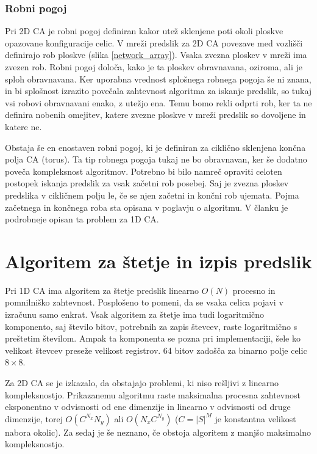 \documentclass[12pt,a4paper,openany,twoside]{book}
\begin{document}
\subsection{Robni pogoj}

Pri 2D CA je robni pogoj definiran kakor utež sklenjene poti okoli ploskve opazovane konfiguracije celic.
V mreži predslik za 2D CA povezave med vozlišči definirajo rob ploskve (slika \ref{network_array}).
Vsaka zvezna ploskev v mreži ima zvezen rob. Robni pogoj določa, kako je ta ploskev obravnavana,
oziroma, ali je sploh obravnavana.
Ker uporabna vrednost splošnega robnega pogoja še ni znana,
in bi splošnost izrazito povečala zahtevnost algoritma za iskanje predslik,
so tukaj vsi robovi obravnavani enako, z utežjo ena. Temu bomo rekli odprti rob,
ker ta ne definira nobenih omejitev, katere zvezne ploskve v mreži predslik
so dovoljene in katere ne.

Obstaja še en enostaven robni pogoj, ki je definiran za ciklično sklenjena končna polja CA (torus).
Ta tip robnega pogoja tukaj ne bo obravnavan, ker še dodatno poveča kompleksnost algoritmov.
Potrebno bi bilo namreč opraviti celoten postopek iskanja predslik za vsak začetni rob posebej.
Saj je zvezna ploskev predslika v cikličnem polju le, če se njen začetni in končni rob ujemata.
Pojma začetnega in končnega roba sta opisana v poglavju o algoritmu.
V članku \cite{JerasDobnikar2007} je podrobneje opisan ta problem za 1D CA.




\chapter{Algoritem za štetje in izpis predslik}
\label{algoritem}

Pri 1D CA \cite{JerasDobnikar2007} ima algoritem za štetje predslik
linearno \(O(N)\) procesno in pomnilniško zahtevnost.
Posplošeno to pomeni, da se vsaka celica pojavi v izračunu samo enkrat.
Vsak algoritem za štetje ima tudi logaritmično komponento,
saj število bitov, potrebnih za zapis števcev, raste logaritmično s preštetim številom.
Ampak ta komponenta se pozna pri implementaciji,
šele ko velikost števcev preseže velikost registrov.
64 bitov zadošča za binarno polje celic \(8 \times 8\).

Za 2D CA se je izkazalo, da obstajajo problemi, ki niso rešljivi z linearno kompleksnostjo.
Prikazanemu algoritmu raste maksimalna procesna zahtevnost
eksponentno v odvisnosti od ene dimenzije in
linearno v odvisnosti od druge dimenzije,
torej \(O(C^{N_x} N_y)\) ali \(O(N_x C^{N_y})\) (\(C=|S|^M\) je konstantna velikost nabora okolic).
Za sedaj je še neznano, če obstoja algoritem z manjšo maksimalno kompleksnostjo.
\end{document}
